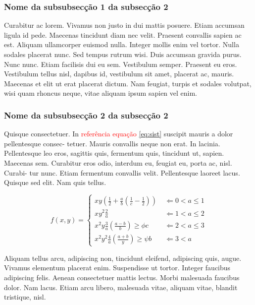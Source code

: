 \subsubsection{Nome da subsubsecção 1 da subsecção 2}
Curabitur ac lorem. Vivamus non justo in dui mattis posuere. Etiam accumsan ligula id pede. Maecenas tincidunt diam nec velit. Praesent convallis sapien ac est. Aliquam ullamcorper euismod nulla. Integer mollis enim vel tortor. Nulla sodales placerat nunc. Sed tempus rutrum wisi. Duis accumsan gravida purus. Nunc nunc. Etiam facilisis dui eu sem. Vestibulum semper. Praesent eu eros. Vestibulum tellus nisl, dapibus id, vestibulum sit amet, placerat ac, mauris. Maecenas et elit ut erat placerat dictum. Nam feugiat, turpis et sodales volutpat, wisi quam rhoncus neque, vitae aliquam ipsum sapien vel enim.

\subsubsection{Nome da subsubsecção 2 da subsecção 2}
Quisque consectetuer. In \textcolor{red}{referência equação} \ref{eq:sist} suscipit mauris a dolor pellentesque consec- tetuer. Mauris convallis neque non erat. In lacinia. Pellentesque leo eros, sagittis quis, fermentum quis, tincidunt ut, sapien. Maecenas sem. Curabitur eros odio, interdum eu, feugiat eu, porta ac, nisl. Curabi- tur nunc. Etiam fermentum convallis velit. Pellentesque laoreet lacus. Quisque sed elit. Nam quis tellus. 

\begin{equation}
    f(x, y) = 
    \begin{cases}
        x  y  \left( \frac{1}{2} + \frac{a}{b} \left(\frac{1}{c} - \frac{1}{2}\right)\right) & \; \Leftarrow 0 < a \leq 1 \\
        x  y^2  \frac{2}{a}                                                                            & \; \Leftarrow 1 < a \leq 2 \\
        x^2  y  \frac{3}{a} \left(\frac{a - b}{b}\right) \geq \phi  c                            & \; \Leftarrow 2 < a \leq 3 \\
        x^2  y^2  \frac{4}{a}\left(\frac{a + b}{y} \right) \geq \psi  b                     & \; \Leftarrow 3 < a
    \end{cases}
    \label{eq:sist}
\end{equation}

Aliquam tellus arcu, adipiscing non, tincidunt eleifend, adipiscing quis, augue. Vivamus elementum placerat enim. Suspendisse ut tortor. Integer faucibus adipiscing felis. Aenean consectetuer mattis lectus. Morbi malesuada faucibus dolor. Nam lacus. Etiam arcu libero, malesuada vitae, aliquam vitae, blandit tristique, nisl.

